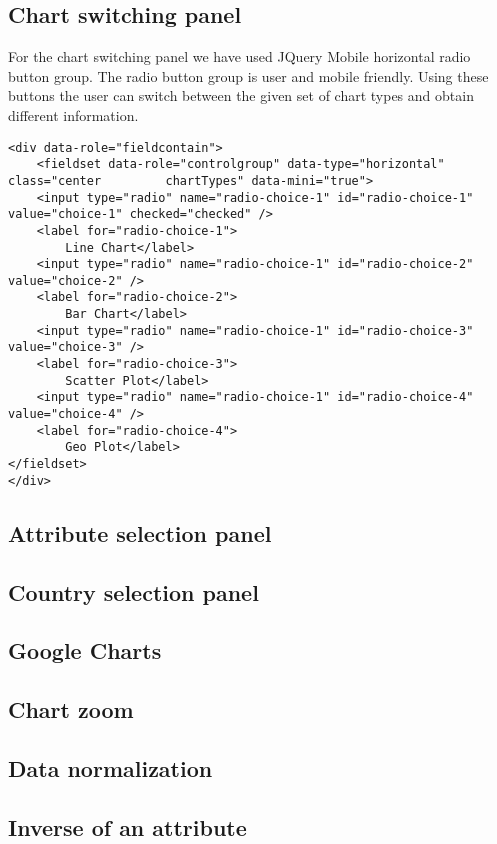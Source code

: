 \documentclass[a4paper]{article}
\begin{document}
\subsection{Chart switching panel}

For the chart switching panel we have used JQuery Mobile horizontal radio button group. The radio button group is user and mobile friendly. Using these buttons the user can switch between the given set of chart types and obtain different information. 

\lstset{
language=HTML,
basicstyle=\small\sffamily,
numbers=left,
numberstyle=\tiny,
frame=tb,
columns=fullflexible,
showstringspaces=false
}
\begin{lstlisting}[caption=Radio button group example code.,
  label=a_label,
  float=t]
<div data-role="fieldcontain">
	<fieldset data-role="controlgroup" data-type="horizontal" class="center 		chartTypes" data-mini="true">
	<input type="radio" name="radio-choice-1" id="radio-choice-1"   				value="choice-1" checked="checked" />
	<label for="radio-choice-1">
		Line Chart</label>
	<input type="radio" name="radio-choice-1" id="radio-choice-2" value="choice-2" />
	<label for="radio-choice-2">
		Bar Chart</label>
	<input type="radio" name="radio-choice-1" id="radio-choice-3" 		value="choice-3" />
	<label for="radio-choice-3">
		Scatter Plot</label>
	<input type="radio" name="radio-choice-1" id="radio-choice-4" value="choice-4" />
	<label for="radio-choice-4">
		Geo Plot</label>
</fieldset>
</div>
\end{lstlisting}

\subsection{Attribute selection panel}
\subsection{Country selection panel}
\subsection{Google Charts}
\subsection{Chart zoom}
\subsection{Data normalization}
\subsection{Inverse of an attribute}
\end{document}
